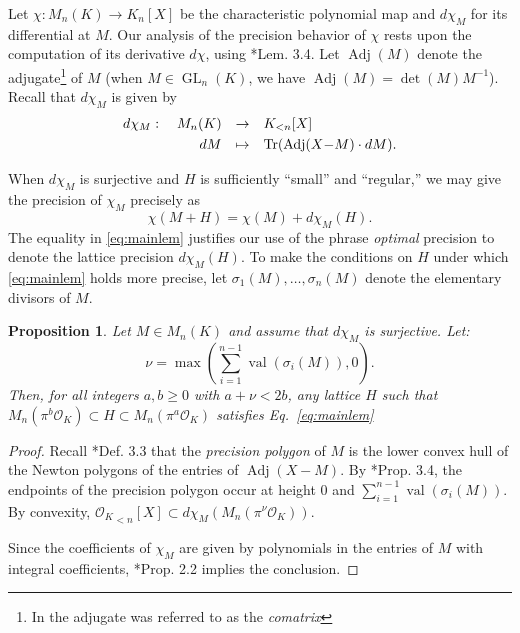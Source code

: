 \documentclass[sigconf]{acmart}
\DeclareMathOperator{\GL}{GL}
\DeclareMathOperator{\val}{val}
\DeclareMathOperator{\tr}{Tr}
\DeclareMathOperator{\adj}{Adj}
\newcommand{\OK}{\mathcal{O}_K}
\newtheorem{prop}[theo]{Proposition}
\theoremstyle{definition}
\begin{document}
Let $\chi : M_n(K) \to K_n[X]$ be the characteristic polynomial map
and $d \chi_M$ for its differential at $M$.
Our analysis of the precision behavior of $\chi$ rests upon
the computation of its derivative $d\chi$, using \cite{caruso-roe-vaccon:14a}*{Lem. 3.4}.
Let $\adj(M)$ denote the adjugate\footnote{In  the adjugate was referred to as the \emph{comatrix}} of $M$ (when $M \in \GL_n(K)$,
we have $\adj(M) {=} \det(M) M^{-1}$).  Recall
that $d\chi_M$ is given by
\begin{equation} \label{eq:dchi}
\begin{array}{rcl}
d\chi_M: \quad M_n(K) & \to & K_{<n}[X] \smallskip \\
 dM & \mapsto & \tr(\adj(X{-}M) \cdot dM).
\end{array}
\end{equation}

When $d\chi_M$ is surjective and $H$ is sufficiently ``small'' and ``regular,'' we may give
the precision of $\chi_M$ precisely as
\begin{equation} \label{eq:mainlem}
\chi(M + H) = \chi(M) + d\chi_M(H).
\end{equation}
The equality in \eqref{eq:mainlem} justifies our use of the phrase \emph{optimal} precision
to denote the lattice precision $d\chi_M(H)$. To make the conditions on $H$ under
which \eqref{eq:mainlem} holds more precise, let
$\sigma_1(M), \dots, \sigma_n(M)$ denote the elementary divisors of $M$.

\begin{prop} \label{prop:mainlem}
Let $M \in M_n(K)$ and assume that $d \chi_M$ is surjective. Let:
\[
\nu = \max\left(\sum_{i=1}^{n-1} \val(\sigma_i(M)), 0\right).
\]
Then, for all integers $a, b \geq 0$ with $a + \nu < 2b$,
any lattice $H$ such that $M_n(\pi^b \OK) \subset H \subset
M_n(\pi^a \OK)$
satisfies Eq.~\eqref{eq:mainlem}
\end{prop}

\begin{proof}
Recall \cite{caruso-roe-vaccon:15a}*{Def. 3.3} that the \emph{precision polygon}
of $M$ is the lower convex hull of the Newton polygons of the entries of $\adj(X-M)$.
By \cite{caruso-roe-vaccon:15a}*{Prop. 3.4}, the endpoints of the precision polygon
occur at height $0$ and $\sum_{i=1}^{n-1} \val(\sigma_i(M))$.  By convexity,
${\OK}_{<n}[X] \subset d\chi_M(M_n(\pi^\nu \OK))$.

Since the coefficients of $\chi_M$ are given by polynomials in the entries of $M$
with integral coefficients, \cite{caruso-roe-vaccon:15a}*{Prop. 2.2} implies
the conclusion.
\end{proof}
\end{document}
